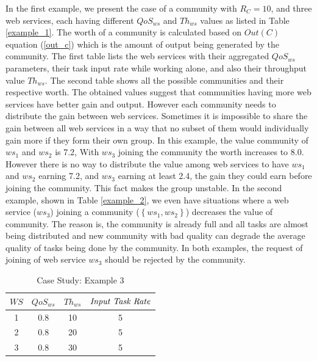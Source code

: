 In the first example,  we present the case of a community with
$R_C =10 $, and three web services, each having different
$QoS_{ws}$ and $Th_{ws}$ values as listed in Table
\ref{example_1}. The worth of a community is calculated based on
$Out(C)$ equation (\ref{out_c}) which is the amount of output
being generated by the community. The first table  lists the web
services with their aggregated $QoS_{ws}$ parameters, their task
input rate while working alone, and also their  throughput value
$Th_{ws}$. The second table shows all the possible communities and
their respective worth. The obtained values suggest that
communities having more web services have better gain and output.
However each community needs to  distribute the gain between web
services. Sometimes it is impossible to share the gain between all
web services in a way that no subset of them would individually
gain more if they form their own group. In this example, the value
community of ${ws_1}$ and ${ws_2}$ is 7.2, With ${ws_3}$ joining
the community the worth increases to 8.0. However there is no way
to distribute the value among web services to have  ${ws_1}$ and
${ws_2}$  earning 7.2, and ${ws_3}$ earning at least 2.4, the gain
they could earn before joining the community. This fact makes the
group unstable. In the second  example, shown in Table
\ref{example_2}, we even have situations where a web service
(${ws_3}$) joining a community ($\left\{ws_1,ws_2\right\}$)
decreases the value of community. The reason is, the community is
already full and all tasks are almost being distributed and new
community with bad quality can degrade the average quality of
tasks being done by the community. In both examples, the request
of joining of web service ${ws_3}$ should be rejected by the
community.

\begin{table}[!t]
\renewcommand{\arraystretch}{1.3}
\caption{Case Study: Example 3}
\label{example_3}
\centering
\begin{tabular}{c c c c}
\hline
$WS$ & $QoS_{ws}$ & $Th_{ws}$ & $\text{\emph{Input Task Rate}}$\\
\hline
1 & 0.8 & 10 & 5\\
2 & 0.8 & 20 & 5\\
3 & 0.8 & 30 & 5\\
\hline
\end{tabular}
\end{table}

